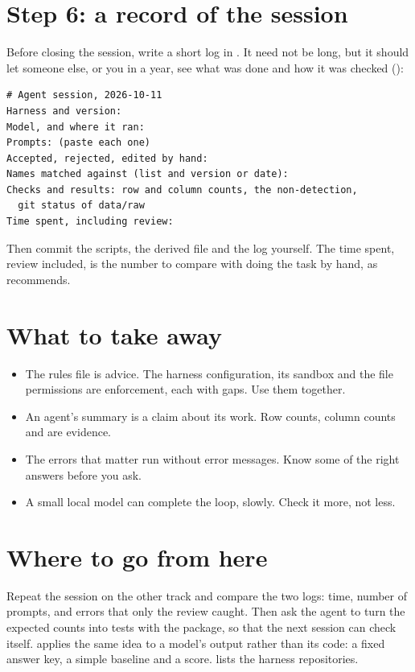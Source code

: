 \section{Step 6: a record of the session}

Before closing the session, write a short log in . It need not be
long, but it should let someone else, or you in a year, see what was done and
how it was checked ():

\begin{lstlisting}[caption={logs/2026-10-11.md}]
# Agent session, 2026-10-11
Harness and version:
Model, and where it ran:
Prompts: (paste each one)
Accepted, rejected, edited by hand:
Names matched against (list and version or date):
Checks and results: row and column counts, the non-detection,
  git status of data/raw
Time spent, including review:
\end{lstlisting}

Then commit the scripts, the derived file and the log yourself. The time
spent, review included, is the number to compare with doing the task by hand,
as  recommends.

\section{What to take away}

\begin{itemize}
  \item The rules file is advice. The harness configuration, its sandbox and
    the file permissions are enforcement, each with gaps. Use them together.
  \item An agent's summary is a claim about its work. Row counts, column
    counts and  are evidence.
  \item The errors that matter run without error messages. Know some of the
    right answers before you ask.
  \item A small local model can complete the loop, slowly. Check it more, not
    less.
\end{itemize}

\section{Where to go from here}

Repeat the session on the other track and compare the two logs: time, number
of prompts, and errors that only the review caught. Then ask the agent to turn
the expected counts into tests with the  package, so that the
next session can check itself.  applies the same idea to a
model's output rather than its code: a fixed answer key, a simple baseline and
a score.  lists the harness repositories.
